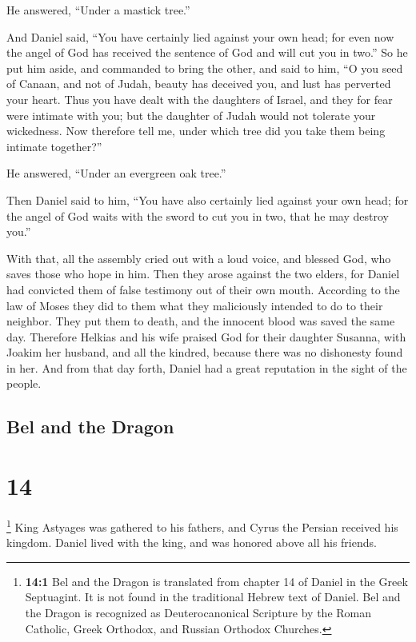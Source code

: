 He answered, ``Under a mastick tree.''

 And Daniel said, ``You have certainly lied against your
own head; for even now the angel of God has received the sentence of God
and will cut you in two.''  So he put him aside, and
commanded to bring the other, and said to him, ``O you seed of Canaan,
and not of Judah, beauty has deceived you, and lust has perverted your
heart.  Thus you have dealt with the daughters of Israel,
and they for fear were intimate with you; but the daughter of Judah
would not tolerate your wickedness.  Now therefore tell
me, under which tree did you take them being intimate together?''

He answered, ``Under an evergreen oak tree.''

 Then Daniel said to him, ``You have also certainly lied
against your own head; for the angel of God waits with the sword to cut
you in two, that he may destroy you.''

 With that, all the assembly cried out with a loud voice,
and blessed God, who saves those who hope in him.  Then
they arose against the two elders, for Daniel had convicted them of
false testimony out of their own mouth.  According to the
law of Moses they did to them what they maliciously intended to do to
their neighbor. They put them to death, and the innocent blood was saved
the same day.  Therefore Helkias and his wife praised God
for their daughter Susanna, with Joakim her husband, and all the
kindred, because there was no dishonesty found in her. 
And from that day forth, Daniel had a great reputation in the sight of
the people.

\hypertarget{bel-and-the-dragon}{%
\subsection{Bel and the Dragon}\label{bel-and-the-dragon}}

\hypertarget{section-13}{%
\section{14}\label{section-13}}

 \footnote{\textbf{14:1} Bel and the Dragon is translated
  from chapter 14 of Daniel in the Greek Septuagint. It is not found in
  the traditional Hebrew text of Daniel. Bel and the Dragon is
  recognized as Deuterocanonical Scripture by the Roman Catholic, Greek
  Orthodox, and Russian Orthodox Churches.} King Astyages was gathered
to his fathers, and Cyrus the Persian received his kingdom.
 Daniel lived with the king, and was honored above all his
friends.

